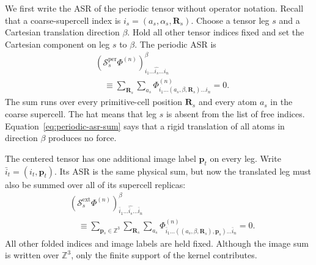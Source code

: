 \documentclass{article}
\newcommand{\ASR}{\mathcal S}
\begin{document}
We first write the ASR of the periodic tensor without operator notation.
Recall that a coarse-supercell index is
$i_s=(a_s,\alpha_s,\bm R_s)$. Choose a tensor leg $s$ and a Cartesian
translation direction $\beta$. Hold all other tensor indices fixed and set
the Cartesian component on leg $s$ to $\beta$. The periodic ASR is
\begin{align}
    &\left(\ASR_s^{\mathrm{per}}\Phi^{(n)}\right)^\beta_
    {i_1\ldots\widehat{i_s}\ldots i_n}
    \nonumber\\
    &\quad\equiv
    \sum_{\bm R_s}
    \sum_{a_s}
    \Phi^{(n)}_
    {i_1\ldots(a_s,\beta,\bm R_s)\ldots i_n}
    =0.
    \label{eq:periodic-asr-sum}
\end{align}
The sum runs over every primitive-cell position $\bm R_s$ and every atom
$a_s$ in the coarse supercell. The hat means that leg $s$ is absent from
the list of free indices. Equation~\eqref{eq:periodic-asr-sum} says that a
rigid translation of all atoms in direction $\beta$ produces no force.

The centered tensor has one additional image label $\bm p_t$ on every leg.
Write $\bar i_t=(i_t,\bm p_t)$. Its ASR is the same physical sum, but now
the translated leg must also be summed over all of its supercell replicas:
\begin{align}
    &\left(\ASR_s^{\mathrm{ext}}\varPhi^{(n)}\right)^\beta_
    {\bar i_1\ldots\widehat{\bar i_s}\ldots\bar i_n}
    \nonumber\\
    &\quad\equiv
    \sum_{\bm p_s\in\mathbb Z^3}
    \sum_{\bm R_s}
    \sum_{a_s}
    \varPhi^{(n)}_
    {\bar i_1\ldots((a_s,\beta,\bm R_s),\bm p_s)\ldots\bar i_n}
    =0.
    \label{eq:extended-asr-sum}
\end{align}
All other folded indices and image labels are held fixed. Although the image
sum is written over $\mathbb Z^3$, only the finite support of the kernel
contributes.
\end{document}
